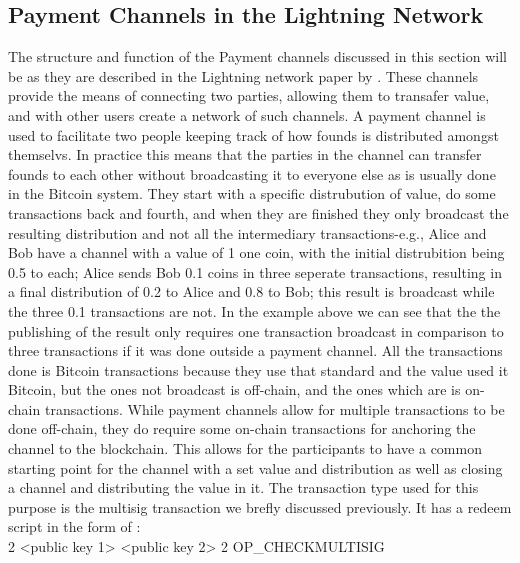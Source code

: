 \subsection{Payment Channels in the Lightning Network} 
\label{subsec:pcln}

The structure and function of the Payment channels discussed in this section will be as they are described in the Lightning network paper by . These channels provide the means of connecting two parties, allowing them to transafer value, and with other users create a network of such channels. A payment channel is used to facilitate two people keeping track of how founds is distributed amongst themselvs. In practice this means that the parties in the channel can transfer founds to each other without broadcasting it to everyone else as is usually done in the Bitcoin system. They start with a specific distrubution of value, do some transactions back and fourth, and when they are finished they only broadcast the resulting distribution and not all the intermediary transactions-e.g., Alice and Bob have a channel with a value of 1 one coin, with the initial distrubition being 0.5 to each; Alice sends Bob 0.1 coins in three seperate transactions, resulting in a final distribution of 0.2 to Alice and 0.8 to Bob; this result is broadcast while the three 0.1 transactions are not.
In the example above we can see that the the publishing of the result only requires one transaction broadcast in comparison to three transactions if it was done outside a payment channel. All the transactions done is Bitcoin transactions because they use that standard and the value used it Bitcoin, but the ones not broadcast is off-chain, and the ones which are is on-chain transactions.
While payment channels allow for multiple transactions to be done off-chain, they do require some on-chain transactions for anchoring the channel to the blockchain. This allows for the participants to have a common starting point for the channel with a set value and distribution as well as closing a channel and distributing the value in it.
The transaction type used for this purpose is the multisig transaction we brefly discussed previously. It has a redeem script in the form of :
\\

2 <public key 1> <public key 2> 2 OP\_CHECKMULTISIG
\\

